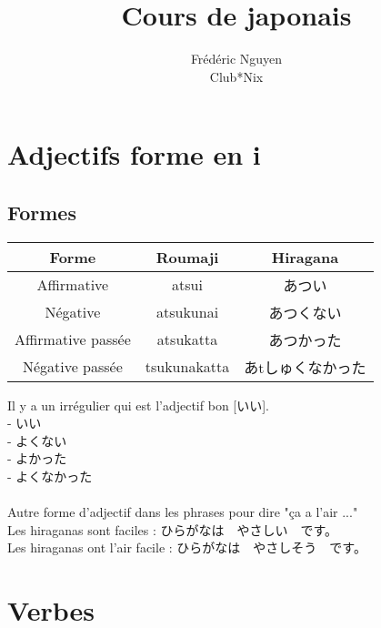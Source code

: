 \documentclass[11pt]{report}
\title{Cours de japonais}
\author{
	Frédéric Nguyen \\ Club*Nix
}
\newenvironment{Japanese}{%
\CJKfamily{min}%
\CJKtilde  
\CJKnospace}{}
\begin{document}
\maketitle
\tableofcontents

\chapter{Adjectifs forme en i}

\section{Formes}

\begin{CJK}{UTF8}{}  
\begin{Japanese}
	\begin{center}
		\begin{tabular}{|c|c|c|}
			\hline
			\textbf{Forme} & \textbf{Roumaji} & \textbf{Hiragana} \\
			\hline
			Affirmative & atsui & あつい \\
			\hline
			Négative & atsukunai & あつくない \\
			\hline
			Affirmative passée & atsukatta & あつかった \\
			\hline
			Négative passée & tsukunakatta & あtしゅくなかった \\
			\hline 
		\end{tabular}
	\end{center}
	Il y a un irrégulier qui est l'adjectif bon [いい]. \\
	- いい \\
	- よくない \\
	- よかった \\
	- よくなかった \\ \\
	
	Autre forme d'adjectif dans les phrases pour dire "ça a l'air ..." \\
	Les hiraganas sont faciles : ひらがなは　やさしい　です。 \\
	Les hiraganas ont l'air facile : ひらがなは　やさしそう　です。 \\
\end{Japanese}  
\end{CJK}  

\chapter{Verbes}
\end{document}
